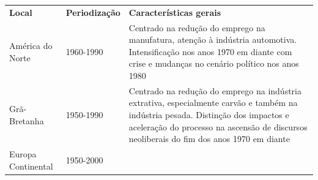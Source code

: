 \begin{longtable}[]{@{}
  >{\raggedright\arraybackslash}p{}
  >{\raggedright\arraybackslash}p{}
  >{\raggedright\arraybackslash}p{}@{}}
\toprule\noalign{}
\begin{minipage}[b]{\linewidth}\raggedright
\textbf{Local}
\end{minipage} & \begin{minipage}[b]{\linewidth}\raggedright
\textbf{Periodização}
\end{minipage} & \begin{minipage}[b]{\linewidth}\raggedright
\textbf{Características gerais}
\end{minipage} \\
\begin{minipage}[b]{\linewidth}\raggedright
América do Norte
\end{minipage} & \begin{minipage}[b]{\linewidth}\raggedright
1960-1990
\end{minipage} & \begin{minipage}[b]{\linewidth}\raggedright
Centrado na redução do emprego na manufatura, atenção à indústria
automotiva. Intensificação nos anos 1970 em diante com crise e mudanças
no cenário político nos anos 1980
\end{minipage} \\
\begin{minipage}[b]{\linewidth}\raggedright
Grã-Bretanha
\end{minipage} & \begin{minipage}[b]{\linewidth}\raggedright
1950-1990
\end{minipage} & \begin{minipage}[b]{\linewidth}\raggedright
Centrado na redução do emprego na indústria extrativa, especialmente
carvão e também na indústria pesada. Distinção dos impactos e aceleração
do processo na ascensão de discursos neoliberais do fim dos anos 1970 em
diante
\end{minipage} \\
\begin{minipage}[b]{\linewidth}\raggedright
Europa Continental
\end{minipage} & \begin{minipage}[b]{\linewidth}\raggedright
1950-2000
\end{minipage} & \begin{minipage}[b]{\linewidth}\raggedright

\end{minipage}
\end{longtable}
